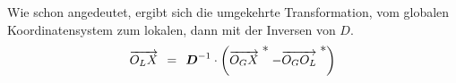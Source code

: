 Wie schon angedeutet, ergibt sich die umgekehrte Transformation, vom globalen Koordinatensystem zum lokalen, dann mit der Inversen von $D$.
\begin{equation}
	\overrightarrow{O_LX} \:\:=\:\: \boldsymbol{D}^{-1}\cdot\left(\overrightarrow{O_GX}\mathrel{\raisebox{10pt}{$*$}} - \overrightarrow{O_GO_L}\mathrel{\raisebox{10pt}{$*$}}\right)
\end{equation}


